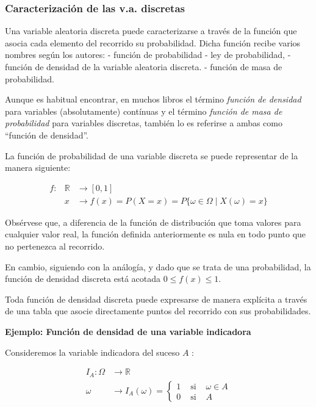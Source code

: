 \documentclass[
]{article}
\begin{document}
\subsubsection{Caracterización de las v.a. discretas}\label{caracterizaciuxf3n-de-las-v.a.-discretas}

Una variable aleatoria discreta puede caracterizarse a través de la
función que asocia cada elemento del recorrido su probabilidad.
Dicha función recibe varios nombres según los autores:
- función de probabilidad
- ley de probabilidad,
- función de densidad de la variable aleatoria
discreta.
- función de masa de probabilidad.

Aunque es habitual encontrar, en muchos libros el término \emph{función de densidad} para variables (absolutamente) contínuas y el término \emph{función de masa de probabilidad} para variables discretas, también lo es referirse a ambas como ``función de densidad''.

La función de probabilidad de una variable discreta se puede representar de la manera siguiente:

\[
\begin{array}{rll}
f: & \mathbb{R} & \rightarrow[0,1] \\
& x & \rightarrow f(x)=P(X=x)=P\{\omega \in \Omega \mid X(\omega)=x\}
\end{array}
\]

Obsérvese que, a diferencia de la función de distribución que toma valores para cualquier valor real, la función definida anteriormente es nula en todo punto que no
pertenezca al recorrido.

En cambio, siguiendo con la análogía, y dado que se trata de una probabilidad, la
función de densidad discreta está acotada \(0 \leq f(x) \leq 1\).

Toda
función de densidad discreta puede expresarse de manera explícita a
través de una tabla que asocie directamente puntos del recorrido con sus
probabilidades.

\textbf{Ejemplo: Función de densidad de una variable indicadora}

Consideremos la variable indicadora del suceso \(A\) :

\[
\begin{aligned}
I_{A}: \Omega & \rightarrow \mathbb{R} \\
\omega & \rightarrow I_{A}(\omega)=\left\{\begin{array}{lll}
1 & \text { si } & \omega \in A \\
0 & \text { si } & A
\end{array}\right.
\end{aligned}
\]
\end{document}

